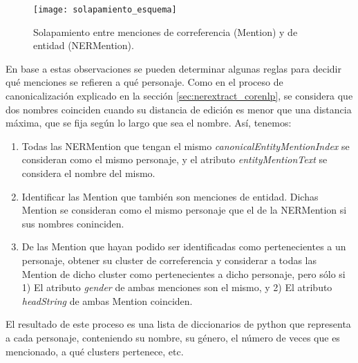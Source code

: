 \documentclass{pre-tfg}
\begin{document}

\begin{figure}
	\centering
	\texttt{[image: solapamiento\_esquema]}
	\caption{Solapamiento entre menciones de correferencia (Mention) y de entidad (NERMention).}
	\label{fig:solapamiento_esquema}
\end{figure}

En base a estas observaciones se pueden determinar algunas reglas para decidir qué menciones se refieren a qué personaje. Como en el proceso de canonicalización explicado en la sección \ref{sec:nerextract_corenlp}, se considera que dos nombres coinciden cuando su distancia de edición es menor que una distancia máxima, que se fija según lo largo que sea el nombre. Así, tenemos:

\begin{enumerate}
	\item Todas las NERMention que tengan el mismo \textit{canonicalEntityMentionIndex} se consideran como el mismo personaje, y el atributo \textit{entityMentionText} se considera el nombre del mismo.
	\item Identificar las Mention que también son menciones de entidad. Dichas Mention se consideran como el mismo personaje que el de la NERMention si sus nombres coninciden.
	\item De las Mention que hayan podido ser identificadas como pertenecientes a un personaje, obtener su cluster de correferencia y considerar a todas las Mention de dicho cluster como pertenecientes a dicho personaje, pero sólo si 1) El atributo \textit{gender} de ambas menciones son el mismo, y 2) El atributo \textit{headString} de ambas Mention coinciden.
\end{enumerate}

El resultado de este proceso es una lista de diccionarios de python que representa a cada personaje, conteniendo su nombre, su género, el número de veces que es mencionado, a qué clusters pertenece, etc.
\end{document}
